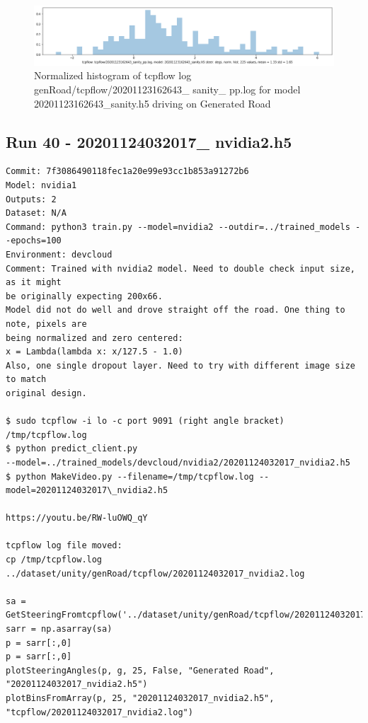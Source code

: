 \begin{figure}[ht]
 \centering 
 \includegraphics[width=\textwidth]{Figures/tcpflow_20201123162643_sanity_pp_bins.png}
 \caption{Normalized histogram of tcpflow log genRoad/tcpflow/20201123162643\_ sanity\_ pp.log for model 20201123162643\_sanity.h5 driving on Generated Road}
 \label{fig:tcpflow_20201123162643_pp_bins} 
\end{figure} 

\subsection{Run 40 - 20201124032017\_ nvidia2.h5}
\begin{verbatim}
Commit: 7f3086490118fec1a20e99e93cc1b853a91272b6
Model: nvidia1
Outputs: 2
Dataset: N/A
Command: python3 train.py --model=nvidia2 --outdir=../trained_models --epochs=100
Environment: devcloud
Comment: Trained with nvidia2 model. Need to double check input size, as it might
be originally expecting 200x66.
Model did not do well and drove straight off the road. One thing to note, pixels are
being normalized and zero centered:
x = Lambda(lambda x: x/127.5 - 1.0)
Also, one single dropout layer. Need to try with different image size to match
original design.

$ sudo tcpflow -i lo -c port 9091 (right angle bracket) /tmp/tcpflow.log
$ python predict_client.py
--model=../trained_models/devcloud/nvidia2/20201124032017_nvidia2.h5
$ python MakeVideo.py --filename=/tmp/tcpflow.log --model=20201124032017\_nvidia2.h5

https://youtu.be/RW-luOWQ_qY

tcpflow log file moved:
cp /tmp/tcpflow.log ../dataset/unity/genRoad/tcpflow/20201124032017_nvidia2.log

sa = GetSteeringFromtcpflow('../dataset/unity/genRoad/tcpflow/20201124032017_nvidia2.log)
sarr = np.asarray(sa)
p = sarr[:,0]
p = sarr[:,0]  
plotSteeringAngles(p, g, 25, False, "Generated Road", "20201124032017_nvidia2.h5")
plotBinsFromArray(p, 25, "20201124032017_nvidia2.h5", "tcpflow/20201124032017_nvidia2.log")
\end{verbatim}

